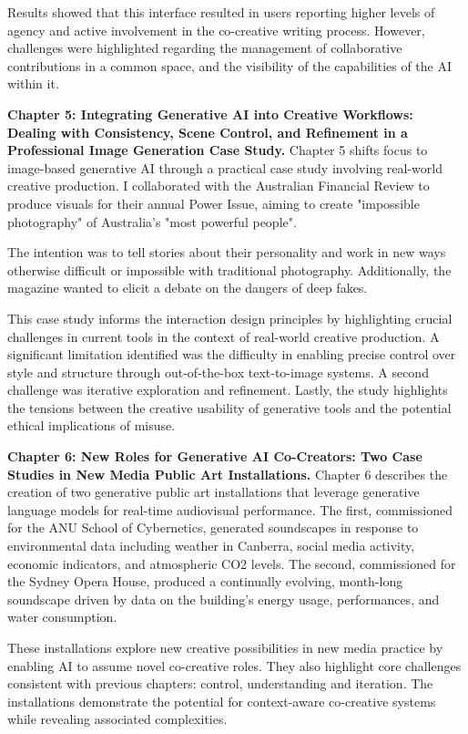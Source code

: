 Results showed that this interface resulted in users reporting higher levels of agency and active involvement in the co-creative writing process. However, challenges were highlighted regarding the management of collaborative contributions in a common space, and the visibility of the capabilities of the AI within it. 

\textbf{Chapter 5: Integrating Generative AI into Creative Workflows: Dealing with Consistency, Scene Control, and Refinement in a Professional Image Generation Case Study.} Chapter 5 shifts focus to image-based generative AI through a practical case study involving real-world creative production. I collaborated with the Australian Financial Review to produce visuals for their annual Power Issue, aiming to create "impossible photography" of Australia's "most powerful people".

The intention was to tell stories about their personality and work in new ways otherwise difficult or impossible with traditional photography. Additionally, the magazine wanted to elicit a debate on the dangers of deep fakes. 

This case study informs the interaction design principles by highlighting crucial challenges in current tools in the context of real-world creative production. A significant limitation identified was the difficulty in enabling precise control over style and structure through out-of-the-box text-to-image systems. A second challenge was iterative exploration and refinement. Lastly, the study highlights the tensions between the creative usability of generative tools and the potential ethical implications of misuse. 

\textbf{Chapter 6: New Roles for Generative AI Co-Creators: Two Case Studies in New Media Public Art Installations.} Chapter 6 describes the creation of two generative public art installations that leverage generative language models for real-time audiovisual performance. The first, commissioned for the ANU School of Cybernetics, generated soundscapes in response to environmental data including weather in Canberra, social media activity, economic indicators, and atmospheric CO2 levels. The second, commissioned for the Sydney Opera House, produced a continually evolving, month-long soundscape driven by data on the building's energy usage, performances, and water consumption.

These installations explore new creative possibilities in new media practice by enabling AI to assume novel co-creative roles. They also highlight core challenges consistent with previous chapters: control, understanding and iteration. The installations demonstrate the potential for context-aware co-creative systems while revealing associated complexities. 

